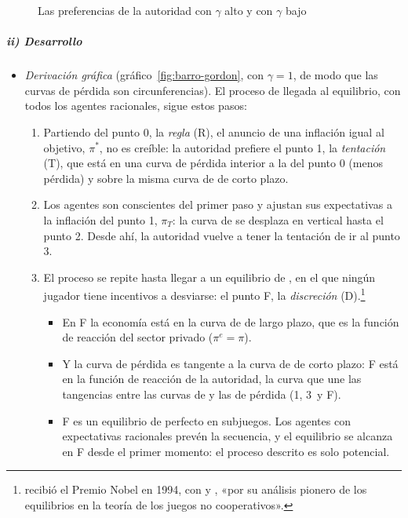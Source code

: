 \documentclass[11pt]{article}
\begin{document}
\begin{figure}[H]
\centering
\caption{Las preferencias de la autoridad con $\gamma$ alto y con $\gamma$ bajo}\label{fig:barro-gordon-preferencias}
\end{figure}

\subparagraph{ii) Desarrollo}

\begin{itemize}
\item \emph{Derivación gráfica} (gráfico~\ref{fig:barro-gordon}, con $\gamma=1$, de modo que las curvas de pérdida son circunferencias). El proceso de llegada al equilibrio, con todos los agentes racionales, sigue estos pasos:
  \begin{enumerate}[label=\roman*)]
  \item Partiendo del punto 0, la \emph{regla} (R), el anuncio de una inflación igual al objetivo, $\pi^*$, no es creíble: la autoridad prefiere el punto 1, la \emph{tentación} (T), que está en una curva de pérdida interior a la del punto 0 (menos pérdida) y sobre la misma curva de  de corto plazo.
  \item Los agentes son conscientes del primer paso y ajustan sus expectativas a la inflación del punto 1, $\pi_T$: la curva de  se desplaza en vertical hasta el punto 2. Desde ahí, la autoridad vuelve a tener la tentación de ir al punto 3.
  \item El proceso se repite hasta llegar a un equilibrio de , en el que ningún jugador tiene incentivos a desviarse: el punto F, la \emph{discreción} (D).\footnote{ recibió el Premio Nobel en 1994, con  y , «por su análisis pionero de los equilibrios en la teoría de los juegos no cooperativos»\nocite{Nobel1994Nash}.}
    \begin{itemize}
    \item En F la economía está en la curva de  de largo plazo, que es la función de reacción del sector privado ($\pi^e=\pi$).
    \item Y la curva de pérdida es tangente a la curva de  de corto plazo: F está en la función de reacción de la autoridad, la curva que une las tangencias entre las curvas de  y las de pérdida (1, 3~y F).
    \item F es un equilibrio de  perfecto en subjuegos. Los agentes con expectativas racionales prevén la secuencia, y el equilibrio se alcanza en F desde el primer momento: el proceso descrito es solo potencial.

\end{itemize}
\end{enumerate}
\end{itemize}
\end{document}

